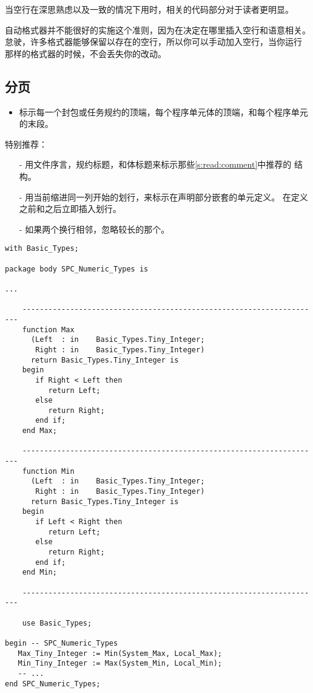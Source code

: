 \begin{blockindent}
当空行在深思熟虑以及一致的情况下用时，相关的代码部分对于读者更明显。
\end{blockindent}

\begin{blockindent}
自动格式器并不能很好的实施这个准则，因为在决定在哪里插入空行和语意相关。
怠驶，许多格式器能够保留以存在的空行，所以你可以手动加入空行，当你运行
那样的格式器的时候，不会丢失你的改动。
\end{blockindent}

\subsection{分页}
\begin{itemize}
    \item 标示每一个封包或任务规约的顶端，每个程序单元体的顶端，和每个程序单元
的末段。
\end{itemize}

\begin{blockindent}
特别推荐：
\begin{itemize}
    \item[-] 用文件序言，规约标题，和体标题来标示那些\ref{s:read:comment}中推荐的
结构。
    \item[-] 用当前缩进同一列开始的划行，来标示在声明部分嵌套的单元定义。
在定义之前和之后立即插入划行。
    \item[-] 如果两个换行相邻，忽略较长的那个。
\end{itemize}
\end{blockindent}

\begin{blockindent}
\noindent
\begin{lstlisting}
with Basic_Types;

package body SPC_Numeric_Types is

...

    ---------------------------------------------------------------------
    function Max
	  (Left  : in    Basic_Types.Tiny_Integer;
	   Right : in    Basic_Types.Tiny_Integer)
	  return Basic_Types.Tiny_Integer is
    begin
       if Right < Left then
          return Left;
       else
          return Right;
       end if;
    end Max;

    ---------------------------------------------------------------------
    function Min
	  (Left  : in    Basic_Types.Tiny_Integer;
	   Right : in    Basic_Types.Tiny_Integer)
	  return Basic_Types.Tiny_Integer is
    begin
       if Left < Right then
          return Left;
       else
          return Right;
       end if;
    end Min;

    ---------------------------------------------------------------------

    use Basic_Types;

begin -- SPC_Numeric_Types
   Max_Tiny_Integer := Min(System_Max, Local_Max);
   Min_Tiny_Integer := Max(System_Min, Local_Min);
   -- ...
end SPC_Numeric_Types;
\end{lstlisting}
\end{blockindent}

